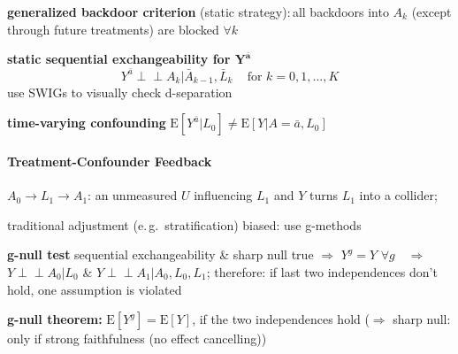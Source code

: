 \documentclass[8pt]{extarticle}
\newcommand{\indep}{\perp \!\!\! \perp}
\begin{document}
\begin{multicols}{2}
\noindent \textbf{generalized backdoor criterion} (static strategy):\,all backdoors into $A_k$ (except through future treatments) are blocked $\forall k$ 


\noindent \textbf{static sequential exchangeability for $\boldsymbol{Y^{\bar{a}}}$}
$$Y^{\bar{a}} \indep A_k| \bar{A}_{k-1}, \bar{L}_k \,\,\,\,\, \text{ for } k=0,1,...,K$$
use SWIGs to visually check d-separation

\noindent \textbf{time-varying confounding} $\mathrm{E}\left[Y^{\bar{a}}|L_0\right] \neq \mathrm{E}\left[Y|A=\bar{a}, L_0\right]$


\paragraph{\large Treatment-Confounder Feedback} $A_0 \rightarrow L_1 \rightarrow A_1$: an unmeasured $U$ influencing $L_1$ and $Y$ turns $L_1$ into a collider;

\noindent traditional adjustment (e.\,g.\ stratification) biased: use g-methods

\noindent \textbf{g-null test} sequential exchangeability \& sharp null true $\Rightarrow$ $Y^g = Y \,\, \forall g$ $\,\,\,\,\Rightarrow \,\,\,\,$ $Y \indep A_0|L_0$ \& $Y \indep A_1|A_0, L_0, L_1$;
therefore: \newline if last two independences don't hold, one assumption is violated

\noindent \textbf{g-null theorem:} $\mathrm{E}\left[Y^g\right] = \mathrm{E}\left[Y\right]$, if the two independences hold \newline($\Rightarrow$ sharp null: only if strong faithfulness (no effect cancelling))



\end{multicols}


\def\bibpreamble{\textit{If no citation is given, the information is taken from the book \citep{hernan2020causal}} \vspace{1.5em}}

\end{document}
